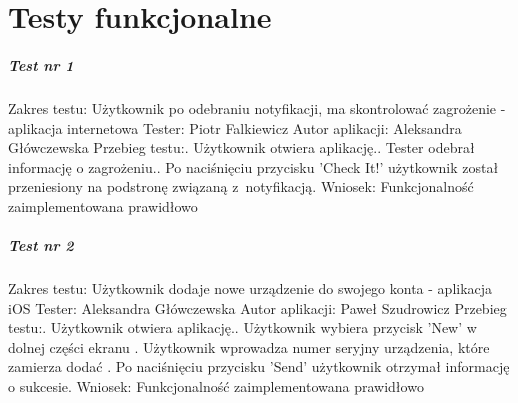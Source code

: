 \chapter{Testy funkcjonalne}

\paragraph{Test nr 1}
Zakres testu:\newline
Użytkownik po odebraniu notyfikacji, ma skontrolować zagrożenie - aplikacja internetowa\newline
Tester: Piotr Falkiewicz\newline
Autor aplikacji: Aleksandra Główczewska\newline
Przebieg testu:. Użytkownik otwiera aplikację.. Tester odebrał informację o zagrożeniu.. Po naciśnięciu przycisku 'Check It!' użytkownik został przeniesiony na podstronę związaną z~notyfikacją.\newline
Wniosek:\newline
Funkcjonalność zaimplementowana prawidłowo\newline
\newline

\paragraph{Test nr 2}
Zakres testu:\newline
Użytkownik dodaje nowe urządzenie do swojego konta - aplikacja iOS\newline
Tester: Aleksandra Główczewska \newline
Autor aplikacji: Paweł Szudrowicz \newline
Przebieg testu:. Użytkownik otwiera aplikację.. Użytkownik wybiera przycisk 'New' w dolnej części ekranu . Użytkownik wprowadza numer seryjny urządzenia, które zamierza dodać . Po naciśnięciu przycisku 'Send' użytkownik otrzymał informację o sukcesie.\newline
Wniosek:\newline
Funkcjonalność zaimplementowana prawidłowo\newline
\newline
 
